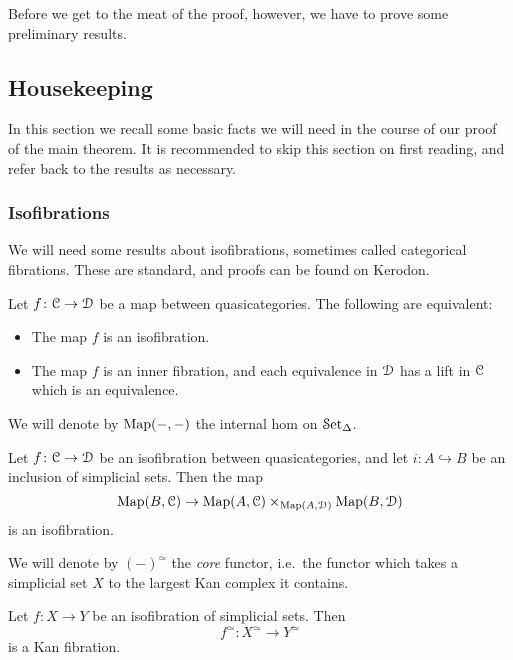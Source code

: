 \documentclass[main.tex]{subfiles}
\begin{document}
Before we get to the meat of the proof, however, we have to prove some preliminary results.

\subsection{Housekeeping}

In this section we recall some basic facts we will need in the course of our proof of the main theorem. It is recommended to skip this section on first reading, and refer back to the results as necessary.

\subsubsection*{Isofibrations}

We will need some results about isofibrations, sometimes called categorical fibrations. These are standard, and proofs can be found on Kerodon.

\begin{proposition}
  \label{prop:characterization_of_isofibrations}
  Let $f\colon \mathcal{C} \to \mathcal{D}$ be a map between quasicategories. The following are equivalent:
  \begin{itemize}
    \item The map $f$ is an isofibration.

    \item The map $f$ is an inner fibration, and each equivalence in $\mathcal{D}$ has a lift in $\mathcal{C}$ which is an equivalence.
  \end{itemize}
\end{proposition}

We will denote by $\mathrm{Map}(-, -)$ the internal hom on $\mathcal{S}\mathrm{et}_{\Delta}$.
\begin{proposition}
  Let $f\colon \mathcal{C} \to \mathcal{D}$ be an isofibration between quasicategories, and let $i\colon A \hookrightarrow B$ be an inclusion of simplicial sets. Then the map
  \begin{equation*}
    \mathrm{Map}(B, \mathcal{C}) \to \mathrm{Map}(A, \mathcal{C}) \times_{\mathrm{Map}(A, \mathcal{D})} \mathrm{Map}(B, \mathcal{D})
  \end{equation*}
  is an isofibration.
\end{proposition}

We will denote by $(-)^{\simeq}$ the \emph{core} functor, i.e.\ the functor which takes a simplicial set $X$ to the largest Kan complex it contains.
\begin{proposition}
  Let $f\colon X \to Y$ be an isofibration of simplicial sets. Then
  \begin{equation*}
    f^{\simeq}\colon X^{\simeq} \to Y^{\simeq}
  \end{equation*}
  is a Kan fibration.
\end{proposition}
\end{document}
